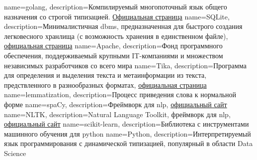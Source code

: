 {
    name=golang,
    description={Компилируемый многопоточный язык общего назначения со строгой типизацией. \href{https://go.dev/}{Официальная страница}}
}
{
    name=SQLite,
    description={Минималистичная \acrshort{dbms}, предназначенная для быстрого создания легковесного хранлища (с возможность хранения в единственном файле), \href{https://www.sqlite.org/index.html}{официальная страница}}
}
{
    name=Apache,
    description={Фонд программного обеспечения, поддерживаемый крупными IT-компаниями и множеством независимых разработчиков со всего мира}
}
{
    name=Tika,
    description={Программа для определения и выделения текста и метаинформации из текста, предствленного в разнообразных форматах, \href{https://tika.apache.org/}{официальная страница}}
}
{
    name=lemmatization,
    description={Процесс приведения слова к нормальной форме}
}
{
    name=spaCy,
    description={Фреймворк для \acrshort{nlp}, \href{https://spacy.io/}{официальный сайт}}
}
{
    name=NLTK,
    description={Natural Language Toolkit, фреймворк для \acrshort{nlp}, \href{https://www.nltk.org/}{официальный сайт}}
}
{
    name=scikit-learn,
    description={Библиотека с инструментами машинного обучения для \gls{python}}
}
{
    name=Python,
    description={Интерпретируемый язык программирования с динамической типизацией, популярный в области Data Science}
}
